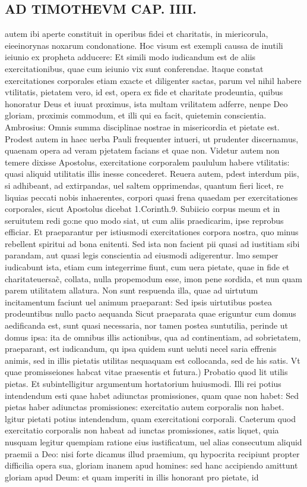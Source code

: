 \documentclass{article}
\begin{document}
\begin{pages}
\section*{AD TIMOTHEVM CAP. IIII. }
\marginpar{[ p.98 ]}\pstart autem ibi aperte constituit in operibus fidei et charitatis, in miericorula, eieeinorynas noxarum condonatione. Hoc visum est exempli caussa de inutili ieiunio ex propheta adducere: Et simili modo iudicandum est de aliis exercitationibus, quae cum ieiunio vix sunt conferendae. ltaque constat exercitationes corporales etiam exacte et diligenter sactas, parum vel nihil habere vtilitatis, pietatem vero, id est, opera ex fide et charitate prodeuntia, quibus honoratur Deus et iuuat proximus, ista multam vrilitatem adferre, nenpe Deo gloriam, proximis commodum, et illi qui ea facit, quietemin conscientia. Ambrosius: Omnis summa disciplinae nostrae in misericordia et pietate est. Prodest autem in haec uerba Pauli frequenter intueri, ut prudenter discernamus, quaenam opera ad veram pjetatem facians et quae non. Videtur autem non temere dixisse Apostolus, exercitatione corporalem paululum habere vtilitatis: quasi aliquid utilitatis illis inesse concederet. Reuera autem, pdest interdum piis, si adhibeant, ad extirpandas, uel saltem opprimendas, quantum fieri licet, re liquias peccati nobis inhaerentes, corpori quasi frena quaedam per exercitationes corporales, sicut Apostolus dicebat 1.Corinth.9. Subiicio corpus meum et in seruitutem redi go:ne quo modo siat, ut cum aliis praedicarim, ipse reprobus efficiar. Et praeparantur per istiusmodi exercitationes corpora nostra, quo minus rebellent spiritui ad bona enitenti. Sed ista non facient pii quasi ad iustitiam sibi parandam, aut quasi legis conscientia ad eiusmodi adigerentur. lmo semper iudicabunt ista, etiam cum integerrime fiunt, cum uera pietate, quae in fide et charitateuersac̃, collata, nulla propemodum esse, imon pene sordida, et nun quam parem utilitatem allatura. Non sunt respuenda illa, quae ad uirtutum incitamentum faciunt uel animum praeparant: Sed ipsis uirtutibus postea prodeuntibus nullo pacto aequanda Sicut praeparata quae eriguntur cum domus aedificanda est, sunt quasi necessaria, nor tamen postea suntutilia, perinde ut domus ipsa: ita de omnibus illis actionibus, qua ad continentiam, ad sobrietatem, praeparant, est iudicandum, qu ipsa quidem sunt ueluti necel saria effrenis animis, sed in illis pietatis utilitas nequaquam est collocanda, sed de his satis.  \pend\pstart Vt quae promisseiones habcat vitae praesentis et futura.) Probatio quod lit utilis pietas. Et subintelligitur argumentum hortatorium huiusmodi. Illi rei potius intendendum esti quae habet adiunctas promissiones, quam quae non habet: Sed pietas haber adiunctas promissiones: exercitatio autem corporalis non habet. lgitur pietati potius intendendum, quam exercitationi corporali. Caeterum quod exercitatio corporalis non habeat ad iunctas promissiones, satis liquet, quia nusquam legitur quempiam ratione eius iustificatum, uel alias consecutum aliquid praemii a Deo: nisi forte dicamus illud praemium, qu hypocrita recipiunt propter difficilia opera sua, gloriam inanem apud homines: sed hanc accipiendo amittunt gloriam apud Deum: et quam imperiti in illis honorant pro pietate, id 
\end{pages}
\end{document}
